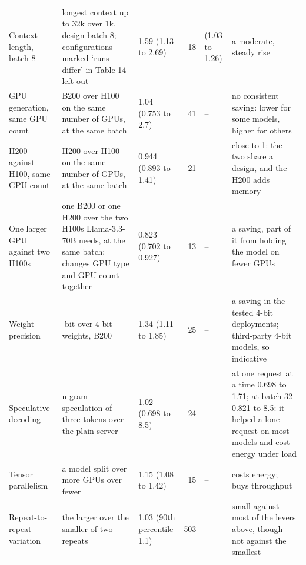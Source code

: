 \begin{landscape}
\begin{table}[p]
\begin{tabular}{>{\raggedright\arraybackslash}p{2.5cm}>{\raggedright\arraybackslash}p{6.0cm}lr>{\raggedright\arraybackslash}p{2.7cm}>{\raggedright\arraybackslash}p{4.9cm}}
Context length, batch 8 & longest context up to 32k over 1k, design batch 8; configurations marked `runs differ' in Table 14 left out & 1.59 (1.13 to 2.69) & 18 & 1.10 (1.03 to 1.26) & a moderate, steady rise \\
GPU generation, same GPU count & B200 over H100 on the same number of GPUs, at the same batch & 1.04 (0.753 to 2.7) & 41 & -- & no consistent saving: lower for some models, higher for others \\
H200 against H100, same GPU count & H200 over H100 on the same number of GPUs, at the same batch & 0.944 (0.893 to 1.41) & 21 & -- & close to 1: the two share a design, and the H200 adds memory \\
One larger GPU against two H100s & one B200 or one H200 over the two H100s Llama-3.3-70B needs, at the same batch; changes GPU type and GPU count together & 0.823 (0.702 to 0.927) & 13 & -- & a saving, part of it from holding the model on fewer GPUs \\
Weight precision & 8-bit over 4-bit weights, B200 & 1.34 (1.11 to 1.85) & 25 & -- & a saving in the tested 4-bit deployments; third-party 4-bit models, so indicative \\
Speculative decoding & n-gram speculation of three tokens over the plain server & 1.02 (0.698 to 8.5) & 24 & -- & at one request at a time 0.698 to 1.71; at batch 32 0.821 to 8.5: it helped a lone request on most models and cost energy under load \\
Tensor parallelism & a model split over more GPUs over fewer & 1.15 (1.08 to 1.42) & 15 & -- & costs energy; buys throughput \\
Repeat-to-repeat variation & the larger over the smaller of two repeats & 1.03 (90th percentile 1.1) & 503 & -- & small against most of the levers above, though not against the smallest \\
\bottomrule
\end{tabular}
\end{table}
\end{landscape}
